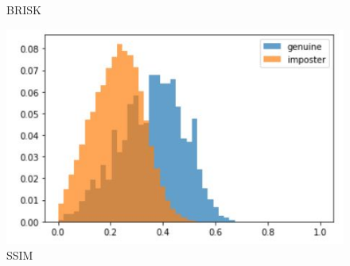 \documentclass{article}
\begin{document}
\begin{figure}[!htb]
\begin{minipage}{0.24\textwidth}
     \caption{BRISK}\label{Fig:Data3}
   \end{minipage}\hfill
   \begin{minipage}{0.24\textwidth}
     \centering
     \includegraphics[width=1\linewidth, scale=1.2]{./imgs/ssim_histogram.jpg}
     \caption{SSIM}\label{Fig:Data4}
   \end{minipage}
\end{figure}
\end{document}
